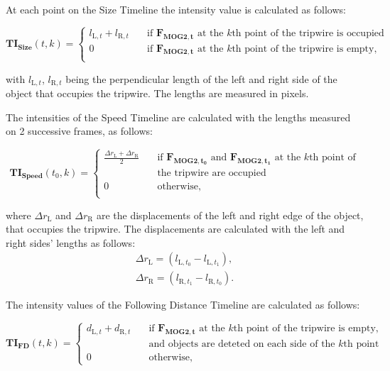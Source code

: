 At each point on the Size Timeline the intensity value is calculated as follows:

\begin{displaymath}
 	\boldsymbol{TI_{\text{Size}}}(t,k) = 
	\begin{cases}
	l_{\text{L},t} + l_{\text{R},t}        & \quad \text{if } \boldsymbol{F_{\text{MOG2},t}} \text{ at the } k\text{th} \text{ point of the tripwire is occupied}\\
  	0		& \quad \text{if } \boldsymbol{F_{\text{MOG2},t}} \text{ at the } k\text{th} \text{ point of the tripwire is empty,}\\
	\end{cases}
\end{displaymath}

with $l_{\text{L},t}$, $l_{\text{R},t}$ being the perpendicular length of the left and right side of the object that occupies the tripwire.
The lengths are measured in pixels.

The intensities of the Speed Timeline are calculated with the lengths measured on 2 successive frames, as follows:

\begin{displaymath}
\boldsymbol{TI_{\text{Speed}}}(t_0,k) = 
\begin{cases}
\frac{\Delta r_{\text{L}} + \Delta r_{\text{R}}}{2}      & \quad \text{if } \boldsymbol{F_{\text{MOG2},t_0}} \text{ and } \boldsymbol{F_{\text{MOG2},t_1}} \text{ at the } k\text{th} \text{ point of} \\ & \quad \text{the tripwire are occupied}\\
0		& \quad \text{otherwise,}\\
\end{cases}
\end{displaymath}
 
where $\Delta r_{\text{L}}$ and $\Delta r_{\text{R}}$ are the displacements of the left and right edge of the object, that occupies the tripwire.
The displacements are calculated with the left and right sides' lengths as follows:
\begin{gather*}
\Delta r_{\text{L}} = \left( l_{\text{L},t_0} - l_{\text{L},t_1} \right),  \\
\Delta r_{\text{R}} = \left( l_{\text{R},t_1} - l_{\text{R},t_0}\right).
\end{gather*}

The intensity values of the Following Distance Timeline are calculated as follows:

\begin{displaymath}
\boldsymbol{TI_{\text{FD}}}(t,k) = 
\begin{cases}
d_{\text{L},t} + d_{\text{R},t} 		& \quad \text{if } \boldsymbol{F_{\text{MOG2},t}} \text{ at the } k\text{th} \text{ point of the tripwire is empty,} \\ & \quad \text{and objects are deteted on each side of the } k \text{th point}\\
0		& \quad \text{otherwise},
\end{cases}
\end{displaymath}

